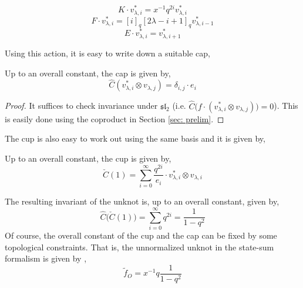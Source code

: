 \documentclass{article}
\begin{document}
$$K \cdot v_{\lambda,i}^* = x^{-1}q^{2i}v_{\lambda,i}^*$$
$$F\cdot v_{\lambda,i}^* = [i]_q [2\lambda-i+1]_qv_{\lambda,i-1}^*$$
$$E\cdot v_{\lambda,i}^* = v_{\lambda,i+1}^*$$

Using this action, it is easy to write down a suitable cap, 
\begin{prop} \label{prop:decat_cap_formula}
Up to an overall constant, the cap is given by, 
$$\hat{C} (v_{\lambda,i}^* \otimes v_{\lambda,j}) = \delta_{i,j} \cdot e_i $$
\end{prop}
\begin{proof}
    It suffices to check invariance under $\mathfrak{sl}_2$ (i.e. $\hat{C}\bigg(f\cdot(v_{\lambda,i}^* \otimes v_{\lambda,j}) \bigg)  =0$). This is easily done using the coproduct in Section \ref{sec: prelim}. 
\end{proof}

The cup is also easy to work out using the same basis and it is given by, 
\begin{prop} \label{prop:decat_cup_formula}
    Up to an overall constant, the cup is given by, 
    $$\check{C}(1) = \sum^\infty_{i=0} \frac{q^{2i}}{e_i} \cdot v^*_{\lambda,i}\otimes v_{\lambda,i}$$
\end{prop}

The resulting invariant of the unknot is, up to an overall constant, given by, 
$$\hat{C}\big(\check{C}(1)\big) = \sum^\infty_{i=0}q^{2i} = \frac{1}{1-q^2}$$
Of course, the overall constant of the cup and the cap can be fixed by some topological constraints. That is, the unnormalized unknot in the state-sum formalism is given by \cite{Park}, 
$$\tilde{f}_{O} = x^{-1}q\frac{1}{1-q^2}$$
\end{document}
